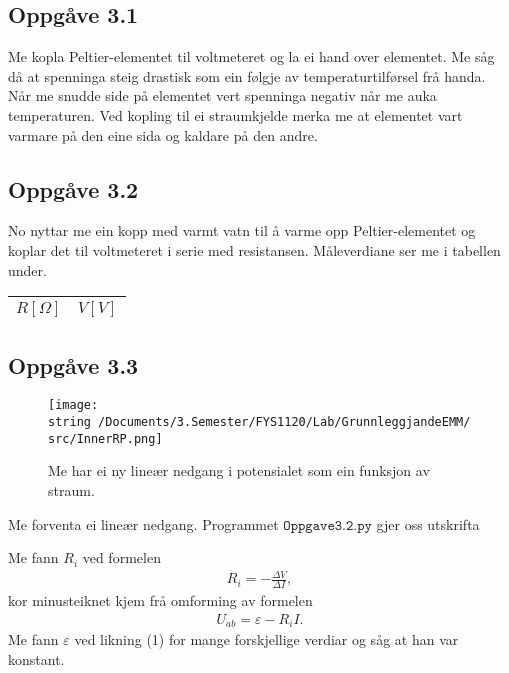 \documentclass[11pt, a4paper]{article}
\begin{document}
  \subsection*{Oppgåve 3.1}
    Me kopla Peltier-elementet til voltmeteret og la ei hand over elementet. Me såg då at spenninga steig drastisk som ein følgje av temperaturtilførsel frå handa. Når me snudde 
    side på elementet vert spenninga negativ når me auka temperaturen. Ved kopling til ei straumkjelde merka me at elementet vart varmare på den eine sida og kaldare på den andre.


  \subsection*{Oppgåve 3.2}
    No nyttar me ein kopp med varmt vatn til å varme opp Peltier-elementet og koplar det til voltmeteret i serie med resistansen.
    Måleverdiane ser me i tabellen under.
    \begin{center}
      \begin{tabular}{|l|l|}
        \hline
        $R [\Omega]$ & $V [V]$ \\
        \hline
        
        \hline
      \end{tabular}
    \end{center}



  \subsection*{Oppgåve 3.3}
    \begin{figure}[H]
      \centering
      \texttt{[image: \\string~/Documents/3.Semester/FYS1120/Lab/GrunnleggjandeEMM/src/InnerRP.png]}
      \caption{Me har ei ny lineær nedgang i potensialet som ein funksjon av straum.}
    \end{figure}

    Me forventa ei lineær nedgang. Programmet $\texttt{Oppgave3.2.py}$ gjer oss utskrifta
    \begin{center}
      
    \end{center}
    Me fann $R_{i}$ ved formelen
    \begin{align*}
      R_i = -\frac{\Delta V}{\Delta I},
    \end{align*}
    kor minusteiknet kjem frå omforming av formelen
    \begin{align}
      U_{ab} = \varepsilon - R_iI.
    \end{align}
    Me fann $\varepsilon$ ved likning (1) for mange forskjellige verdiar og såg at han var konstant.
\end{document}
